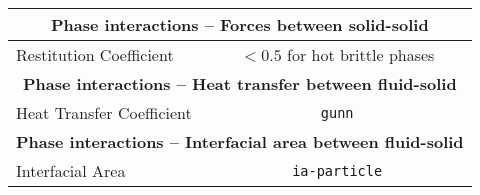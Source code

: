 \begin{table}[!ht]
\begin{tabular}{lcc}
\multicolumn{3}{c}{\textbf{Phase interactions -- Forces between solid-solid}}\\
\midrule
  Restitution Coefficient
& $<0.5$ for hot brittle phases
& 
\\
\midrule
\multicolumn{3}{c}{\textbf{Phase interactions -- Heat transfer between fluid-solid}}\\
\midrule
  Heat Transfer Coefficient
& \Verb|gunn|
& \cite{Gunn1978}
\\
\midrule
\multicolumn{3}{c}{\textbf{Phase interactions -- Interfacial area between fluid-solid}}\\
\midrule
  Interfacial Area
& \Verb|ia-particle|
& 
\\
\bottomrule[2pt]
\end{tabular}
\end{table}

\endinput